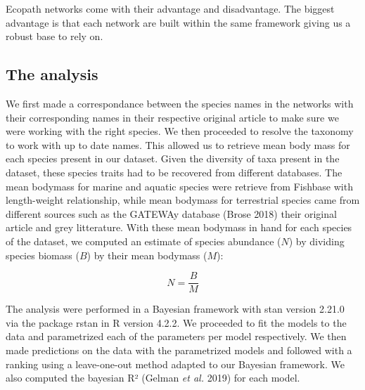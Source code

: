 \documentclass[11pt]{article}
\begin{document}
Ecopath networks come with their advantage and disadvantage. The biggest
advantage is that each network are built within the same framework
giving us a robust base to rely on.

\hypertarget{the-analysis}{%
\subsection{The analysis}\label{the-analysis}}

We first made a correspondance between the species names in the networks
with their corresponding names in their respective original article to
make sure we were working with the right species. We then proceeded to
resolve the taxonomy to work with up to date names. This allowed us to
retrieve mean body mass for each species present in our dataset. Given
the diversity of taxa present in the dataset, these species traits had
to be recovered from different databases. The mean bodymass for marine
and aquatic species were retrieve from Fishbase with length-weight
relationship, while mean bodymass for terrestrial species came from
different sources such as the GATEWAy database (Brose 2018) their
original article and grey litterature. With these mean bodymass in hand
for each species of the dataset, we computed an estimate of species
abundance (\(N\)) by dividing species biomass (\(B\)) by their mean
bodymass (\(M\)):

\[ N = \frac{B}{M} \]

The analysis were performed in a Bayesian framework with stan version
2.21.0 via the package rstan in R version 4.2.2. We proceeded to fit the
models to the data and parametrized each of the parameters per model
respectively. We then made predictions on the data with the parametrized
models and followed with a ranking using a leave-one-out method adapted
to our Bayesian framework. We also computed the bayesian R² (Gelman
\emph{et al.} 2019) for each model.
\end{document}
